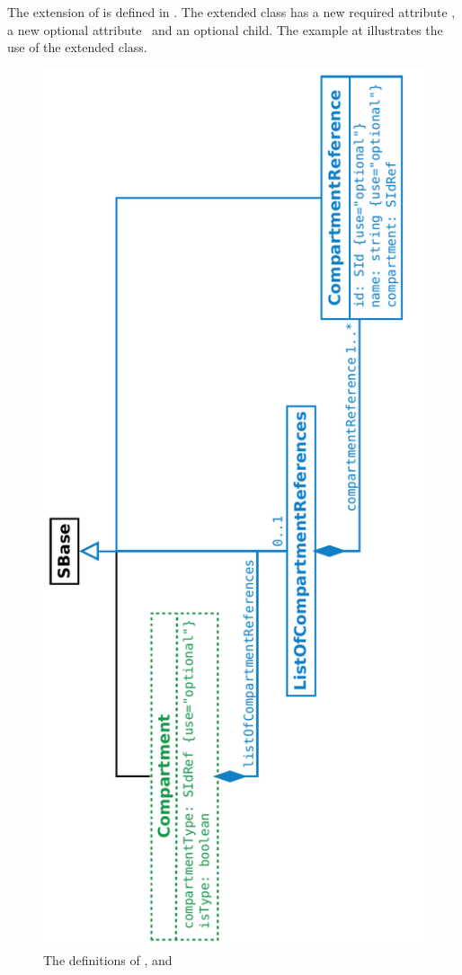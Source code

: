 The extension of  is defined in . The extended \Compartment class has a new required attribute \isTypeAtt, a new optional attribute \compartmentTypeAtt\ and an optional \ListOfCompartmentReferences child. The example at  illustrates the use of the extended \Compartment class.

\begin{figure}[htb]
  \begin{center}
    \includegraphics[angle=-90, scale=0.6]{./figs/multi_012_compartment.pdf}
    \caption{The definitions of \ExCompartment, \ListOfCompartmentReferences and \CompartmentReference}
  \label{fig:Compartment_components}
  \end{center}
\end{figure}

